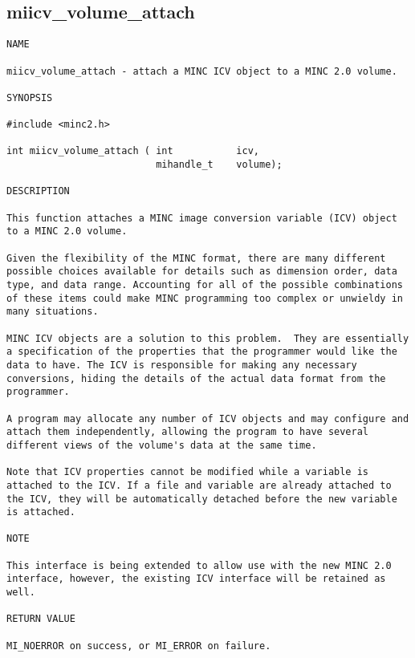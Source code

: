 \documentclass{article}
\begin{document}
\subsection{miicv\_volume\_attach}
\begin{verbatim}
NAME

miicv_volume_attach - attach a MINC ICV object to a MINC 2.0 volume.

SYNOPSIS

#include <minc2.h>

int miicv_volume_attach ( int           icv, 
                          mihandle_t    volume);

DESCRIPTION

This function attaches a MINC image conversion variable (ICV) object
to a MINC 2.0 volume.

Given the flexibility of the MINC format, there are many different
possible choices available for details such as dimension order, data
type, and data range. Accounting for all of the possible combinations
of these items could make MINC programming too complex or unwieldy in
many situations.

MINC ICV objects are a solution to this problem.  They are essentially
a specification of the properties that the programmer would like the
data to have. The ICV is responsible for making any necessary
conversions, hiding the details of the actual data format from the
programmer.

A program may allocate any number of ICV objects and may configure and
attach them independently, allowing the program to have several
different views of the volume's data at the same time.

Note that ICV properties cannot be modified while a variable is
attached to the ICV. If a file and variable are already attached to
the ICV, they will be automatically detached before the new variable
is attached.

NOTE

This interface is being extended to allow use with the new MINC 2.0
interface, however, the existing ICV interface will be retained as
well.

RETURN VALUE

MI_NOERROR on success, or MI_ERROR on failure.
\end{verbatim}
\end{document}

